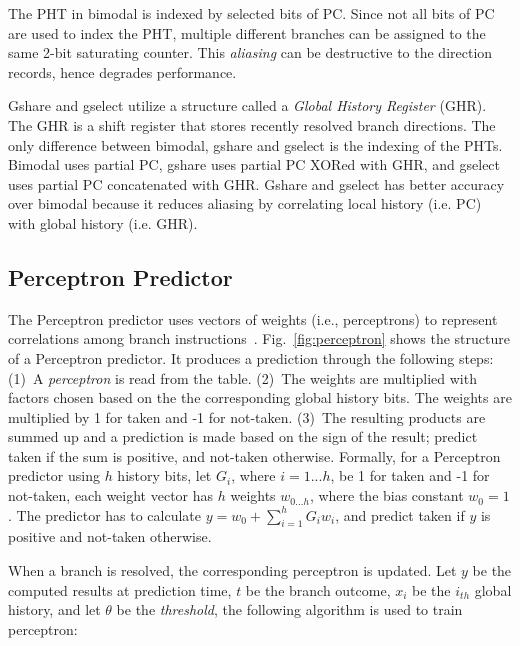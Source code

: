 The PHT in bimodal is indexed by selected bits of PC. Since not all bits of PC are used to index the PHT, multiple different branches can be assigned to the same 2-bit saturating counter. This \textit{aliasing} can be destructive to the direction records, hence degrades performance.

Gshare and gselect utilize a structure called a \textit{Global History Register} (GHR). The GHR is a shift register that stores recently resolved branch directions. The only difference between bimodal, gshare and gselect is the indexing of the PHTs. Bimodal uses partial PC, gshare uses partial PC XORed with GHR, and gselect uses partial PC concatenated with GHR. Gshare and gselect has better accuracy over bimodal because it reduces aliasing by correlating local history (i.e. PC) with global history (i.e. GHR).


\subsection{Perceptron Predictor}
\label{sec:background:dirpred:perceptron}
The Perceptron predictor uses vectors of weights (i.e., perceptrons) to represent correlations among branch instructions~\cite{perceptron}. Fig.~\ref{fig:perceptron} shows the structure of a Perceptron predictor. It produces a prediction through the following steps: (1)~A \textit{perceptron} is read from the table. (2)~The weights are multiplied with factors chosen based on the the corresponding global history bits. The weights are multiplied by 1 for taken and -1 for not-taken. (3)~The resulting products are summed up and a prediction is made based on the sign of the result; predict taken if the sum is positive, and not-taken otherwise. Formally, for a Perceptron predictor using $h$ history bits, let $G_i$, where $i = 1...h$, be 1 for taken and -1 for not-taken, each weight vector has $h$ weights $w_{0...h}$, where the bias constant $w_0 = 1$. The predictor has to calculate $y = w_0 + \sum_{i=1}^{h} G_iw_i$, and predict taken if $y$ is positive and not-taken otherwise.

When a branch is resolved, the corresponding perceptron is updated. Let $y$ be the computed results at prediction time, $t$ be the branch outcome, $x_i$ be the $i_{th}$ global history, and let $\theta$ be the \textit{threshold}, the following algorithm is used to train perceptron:\vspace{8 mm}

